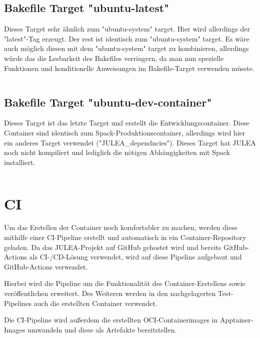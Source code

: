 \inputminted[firstline=35,lastline=50]{./lexers/docker-bake-lexer.py}{./code-examples/docker-bake.hcl}

\subsection{Bakefile Target "ubuntu-latest"}

Dieses Target sehr ähnlich zum "ubuntu-system" target. Hier wird allerdings der "latest"-Tag erzeugt. 
Der rest ist identisch zum "ubuntu-system" target. Es wäre auch möglich diesen mit dem "ubuntu-system" target zu kombinieren, allerdings würde das die Lesbarkeit des Bakefiles verringern, da man nun spezielle Funktionen und konditionelle Anweisungen im Bakefile-Target verwenden müsste.

\inputminted[firstline=52,lastline=62]{./lexers/docker-bake-lexer.py}{./code-examples/docker-bake.hcl}

\subsection{Bakefile Target "ubuntu-dev-container"}

Dieses Target ist das letzte Target und erstellt die Entwicklungscontainer. Diese Container sind identisch zum Spack-Produktionscontainer, allerdings wird hier ein anderes Target verwendet ("JULEA\_dependncies"). Dieses Target hat JULEA noch nicht kompiliert und lediglich die nötigen Abhängigkeiten mit Spack installiert.

\inputminted[firstline=64]{./lexers/docker-bake-lexer.py}{./code-examples/docker-bake.hcl}

\section{CI}

Um das Erstellen der Container noch komfortabler zu machen, werden diese mithilfe einer CI-Pipeline erstellt und automatisch in ein Container-Repository geladen. Da das JULEA-Projekt auf GitHub gehostet wird und bereits GitHub-Actions als CI-/CD-Lösung verwendet, wird auf diese Pipeline aufgebaut und GitHub-Actions verwendet.

Hierbei wird die Pipeline um die Funktionalität des Container-Erstellens sowie veröffentlichen erweitert. Des Weiteren werden in den nachgelagerten Test-Pipelines auch die erstellten Container verwendet.

Die CI-Pipeline wird außerdem die erstellten OCI-Containerimages in Apptainer-Images umwandeln und diese als Artefakte bereitstellen.


